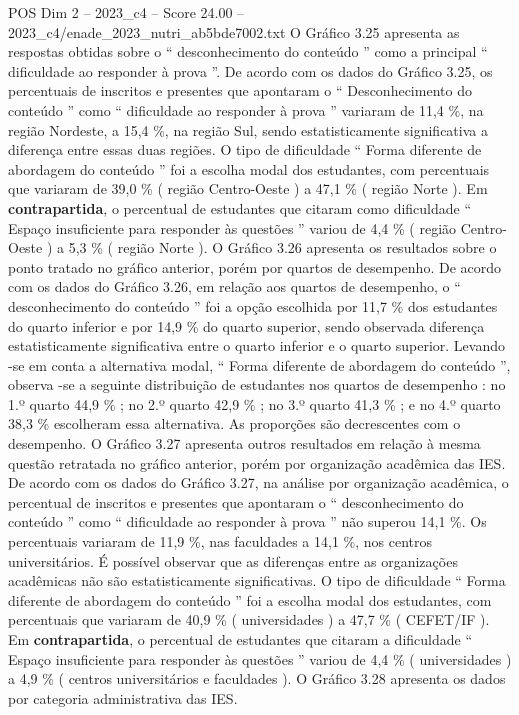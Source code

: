 \begin{textsample}{POS Dim 2 – 2023\_c4 – Score 24.00 – 2023\_c4/enade\_2023\_nutri\_ab5bde7002.txt}
O Gráfico 3.25 apresenta as respostas obtidas sobre o “ desconhecimento do conteúdo ” como a principal “ dificuldade ao responder à prova ”.
De acordo com os dados do Gráfico 3.25, os percentuais de inscritos e presentes que apontaram o “ Desconhecimento do conteúdo ” como “ dificuldade ao responder à prova ” variaram de 11,4 \%, na região Nordeste, a 15,4 \%, na região Sul, sendo estatisticamente significativa a diferença entre essas duas regiões.
O tipo de dificuldade “ Forma diferente de abordagem do conteúdo ” foi a escolha modal dos estudantes, com percentuais que variaram de 39,0 \% ( região Centro-Oeste ) a 47,1 \% ( região Norte ).
Em \textbf{contrapartida}, o percentual de estudantes que citaram como dificuldade “ Espaço insuficiente para responder às questões ” variou de 4,4 \% ( região Centro-Oeste ) a 5,3 \% ( região Norte ).
O Gráfico 3.26 apresenta os resultados sobre o ponto tratado no gráfico anterior, porém por quartos de desempenho.
De acordo com os dados do Gráfico 3.26, em relação aos quartos de desempenho, o “ desconhecimento do conteúdo ” foi a opção escolhida por 11,7 \% dos estudantes do quarto inferior e por 14,9 \% do quarto superior, sendo observada diferença estatisticamente significativa entre o quarto inferior e o quarto superior.
Levando -se em conta a alternativa modal, “ Forma diferente de abordagem do conteúdo ”, observa -se a seguinte distribuição de estudantes nos quartos de desempenho : no 1.º quarto 44,9 \% ; no 2.º quarto 42,9 \% ; no 3.º quarto 41,3 \% ; e no 4.º quarto 38,3 \% escolheram essa alternativa.
As proporções são decrescentes com o desempenho.
O Gráfico 3.27 apresenta outros resultados em relação à mesma questão retratada no gráfico anterior, porém por organização acadêmica das IES.
De acordo com os dados do Gráfico 3.27, na análise por organização acadêmica, o percentual de inscritos e presentes que apontaram o “ desconhecimento do conteúdo ” como “ dificuldade ao responder à prova ” não superou 14,1 \%.
Os percentuais variaram de 11,9 \%, nas faculdades a 14,1 \%, nos centros universitários.
É possível observar que as diferenças entre as organizações acadêmicas não são estatisticamente significativas.
O tipo de dificuldade “ Forma diferente de abordagem do conteúdo ” foi a escolha modal dos estudantes, com percentuais que variaram de 40,9 \% ( universidades ) a 47,7 \% ( CEFET/IF ).
Em \textbf{contrapartida}, o percentual de estudantes que citaram a dificuldade “ Espaço insuficiente para responder às questões ” variou de 4,4 \% ( universidades ) a 4,9 \% ( centros universitários e faculdades ).
O Gráfico 3.28 apresenta os dados por categoria administrativa das IES.

\end{textsample}
